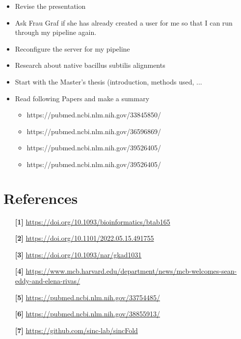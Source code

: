 \documentclass{article}
\begin{document}
\begin{large}
\begin{large}
\begin{large}
\begin{itemize}
    \item Revise the presentation
    \item Ask Frau Graf if she has already created a user for me so that I can run through my pipeline again.
    \item Reconfigure the server for my pipeline
    \item Research about native bacillus subtilis alignments
    \item Start with the Master's thesis (introduction, methods used, ...
    \item Read following Papers and make a summary
    \begin{itemize}
        \item https://pubmed.ncbi.nlm.nih.gov/33845850/
        \item https://pubmed.ncbi.nlm.nih.gov/36596869/
        \item https://pubmed.ncbi.nlm.nih.gov/39526405/
        \item https://pubmed.ncbi.nlm.nih.gov/39526405/
    \end{itemize}
\end{itemize}

\section{References}

\begin{itemize}
    \item[\textbf{[1]}] \url{https://doi.org/10.1093/bioinformatics/btab165} \par
    \item[\textbf{[2]}] \url{https://doi.org/10.1101/2022.05.15.491755}
    \item[\textbf{[3]}] \url{https://doi.org/10.1093/nar/gkad1031} \par
    \item[\textbf{[4]}] \url{https://www.mcb.harvard.edu/department/news/mcb-welcomes-sean-eddy-and-elena-rivas/}
    \item[\textbf{[5]}] \url{https://pubmed.ncbi.nlm.nih.gov/33754485/} \par
    \item[\textbf{[6]}] \url{https://pubmed.ncbi.nlm.nih.gov/38855913/} \par
    \item[\textbf{[7]}] \url{https://github.com/sinc-lab/sincFold} \par
\end{itemize}


\end{large}
\end{large}
\end{large}
\end{document}
